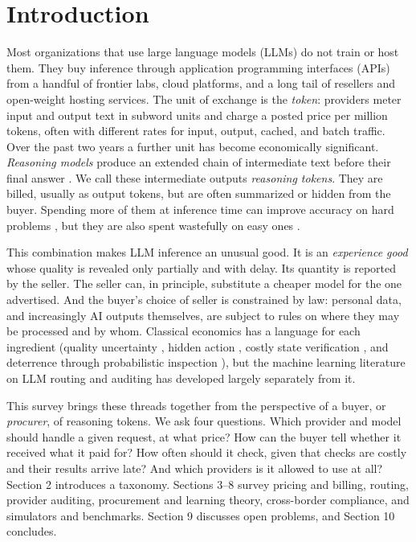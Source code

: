\section{Introduction}\label{introduction}

Most organizations that use large language models (LLMs) do not train or host them. They buy inference through application programming interfaces (APIs) from a handful of frontier labs, cloud platforms, and a long tail of resellers and open-weight hosting services. The unit of exchange is the \emph{token}: providers meter input and output text in subword units and charge a posted price per million tokens, often with different rates for input, output, cached, and batch traffic. Over the past two years a further unit has become economically significant. \emph{Reasoning models} produce an extended chain of intermediate text before their final answer \cite{wei2022cot, openai2024o1card, deepseek2025r1}. We call these intermediate outputs \emph{reasoning tokens}. They are billed, usually as output tokens, but are often summarized or hidden from the buyer. Spending more of them at inference time can improve accuracy on hard problems \cite{snell2024scaling}, but they are also spent wastefully on easy ones \cite{chen2024overthinking, han2024tokenbudget}.

This combination makes LLM inference an unusual good. It is an \emph{experience good} whose quality is revealed only partially and with delay. Its quantity is reported by the seller. The seller can, in principle, substitute a cheaper model for the one advertised. And the buyer's choice of seller is constrained by law: personal data, and increasingly AI outputs themselves, are subject to rules on where they may be processed and by whom. Classical economics has a language for each ingredient (quality uncertainty \cite{akerlof1970lemons}, hidden action \cite{holmstrom1979moral}, costly state verification \cite{townsend1979csv}, and deterrence through probabilistic inspection \cite{becker1968crime, avenhaus2002inspection}), but the machine learning literature on LLM routing and auditing has developed largely separately from it.

This survey brings these threads together from the perspective of a buyer, or \emph{procurer}, of reasoning tokens. We ask four questions. Which provider and model should handle a given request, at what price? How can the buyer tell whether it received what it paid for? How often should it check, given that checks are costly and their results arrive late? And which providers is it allowed to use at all? Section 2 introduces a taxonomy. Sections 3--8 survey pricing and billing, routing, provider auditing, procurement and learning theory, cross-border compliance, and simulators and benchmarks. Section 9 discusses open problems, and Section 10 concludes.

